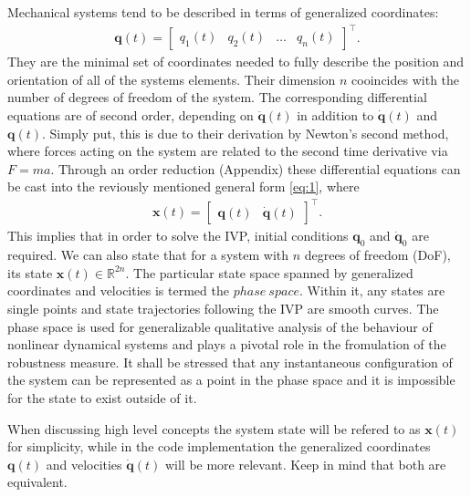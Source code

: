     Mechanical systems tend to be described in terms of generalized coordinates: \begin{gather}\mathbf{q}(t)=\begin{bmatrix}q_1(t)&q_2(t)&\ldots&q_n(t) \end{bmatrix}^\intercal . \end{gather} They are the minimal set of coordinates needed to fully describe the position and orientation of all of the systems elements. Their dimension $n$ cooincides with the number of degrees of freedom of the system. The corresponding differential equations are of second order, depending on $\ddot{\mathbf{q}}(t)$ in addition to $\dot{\mathbf{q}}(t)$ and $\mathbf{q}(t)$. Simply put, this is due to their derivation by Newton's second method, where forces acting on the system are related to the second time derivative via $F = ma$.
    Through an order reduction (Appendix) these differential equations can be cast into the reviously mentioned general form \ref{eq:1}, where \begin{gather*} \mathbf{x}(t) = \begin{bmatrix}\mathbf{q}(t)&\dot{\mathbf{q}}(t)\end{bmatrix}^\intercal .\end{gather*}
    This implies that in order to solve the IVP, initial conditions $\mathbf{q}_0$ and $\dot{\mathbf{q}}_0$ are required. We can also state that for a system with $n$ degrees of freedom (DoF), its state $\mathbf{x}(t) \in \mathbb{R}^{2n}$. The particular state space spanned by generalized coordinates and velocities is termed the $phase\ space$. Within it, any states are single points and state trajectories following the IVP are smooth curves. The phase space is used for generalizable qualitative analysis of the behaviour of nonlinear dynamical systems and plays a pivotal role in the fromulation of the robustness measure. It shall be stressed that any instantaneous configuration of the system can be represented as a point in the phase space and it is impossible for the state to exist outside of it. 

    When discussing high level concepts the system state will be refered to as $\mathbf{x}(t)$ for simplicity, while in the code implementation the generalized coordinates $\mathbf{q}(t)$ and velocities $\dot{\mathbf{q}}(t)$ will be more relevant. Keep in mind that both are equivalent.









